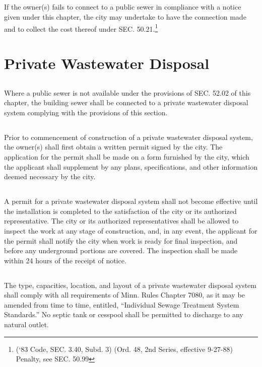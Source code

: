 \subsection{}
If the owner(s) fails to connect to a public sewer in compliance with a notice given under this chapter, the city may undertake to have the connection made and to collect the cost thereof under SEC. 50.21.\footnote{(‘83 Code, SEC. 3.40, Subd. 3) (Ord. 48, 2nd Series, effective 9-27-88) Penalty, see SEC. 50.99}

\section{Private Wastewater Disposal}
\subsection{}
Where a public sewer is not available under the provisions of SEC. 52.02 of this chapter, the building sewer shall be connected to a private wastewater disposal system complying with the provisions of this section.
\subsection{}
Prior to commencement of construction of a private wastewater disposal system, the owner(s) shall first obtain a written permit signed by the city.  The application for the permit shall be made on a form furnished by the city, which the applicant shall supplement by any plans, specifications, and other information deemed necessary by the city.
\subsection{}
A permit for a private wastewater disposal system shall not become effective until the installation is completed to the satisfaction of the city or its authorized representative.  The city or its authorized representatives shall be allowed to inspect the work at any stage of construction, and, in any event, the applicant for the permit shall notify the city when work is ready for final inspection, and before any underground portions are covered.  The inspection shall be made within 24 hours of the receipt of notice.
\subsection{}
The type, capacities, location, and layout of a private wastewater disposal system shall comply with all requirements of Minn. Rules Chapter 7080, as it may be amended from time to time, entitled, “Individual Sewage Treatment System Standards.” No septic tank or cesspool shall be permitted to discharge to any natural outlet.
